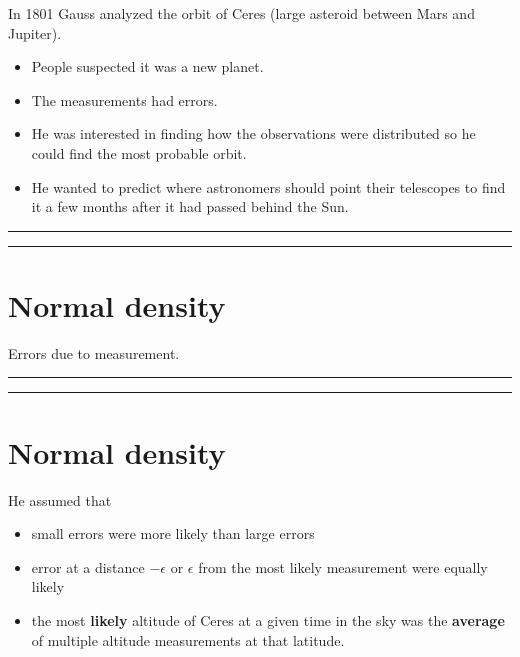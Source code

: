 \documentclass[
]{book}
\providecommand{\tightlist}{%
  \setlength{\itemsep}{0pt}\setlength{\parskip}{0pt}}
\begin{document}
In 1801 Gauss analyzed the orbit of Ceres (large asteroid between Mars and Jupiter).

\begin{itemize}
\tightlist
\item
  People suspected it was a new planet.
\item
  The measurements had errors.
\item
  He was interested in finding how the observations were distributed so he could find the most probable orbit.
\item
  He wanted to predict where astronomers should point their telescopes to find it a few months after it had passed behind the Sun.
\end{itemize}

\begin{center}\rule{0.5\linewidth}{0.5pt}\end{center}

\begin{center}\rule{0.5\linewidth}{0.5pt}\end{center}

\hypertarget{normal-density-1}{%
\section{Normal density}\label{normal-density-1}}

Errors due to measurement.

\begin{center}\rule{0.5\linewidth}{0.5pt}\end{center}

\begin{center}\rule{0.5\linewidth}{0.5pt}\end{center}

\hypertarget{normal-density-2}{%
\section{Normal density}\label{normal-density-2}}

He assumed that

\begin{itemize}
\tightlist
\item
  small errors were more likely than large errors
\item
  error at a distance \(-\epsilon\) or \(\epsilon\) from the most likely measurement were equally likely
\item
  the most \textbf{likely} altitude of Ceres at a given time in the sky was the \textbf{average} of multiple altitude measurements at that latitude.
\end{itemize}
\end{document}
